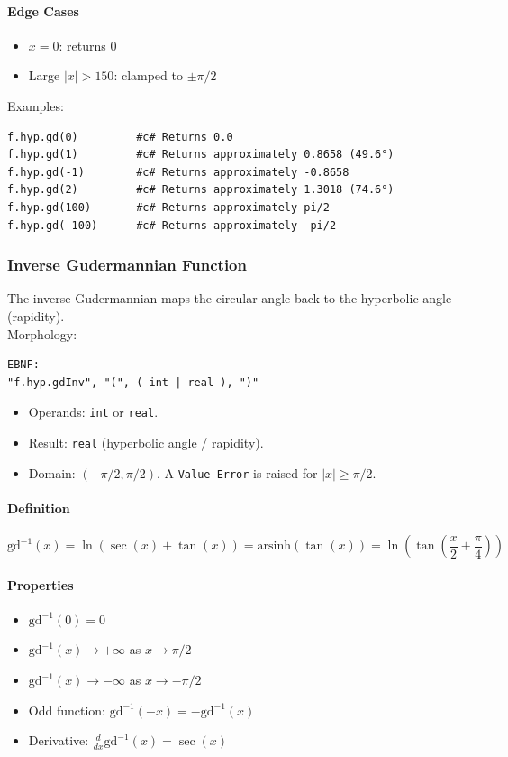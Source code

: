 \paragraph{Edge Cases}
\begin{itemize}
\item $x = 0$: returns $0$
\item Large $|x| > 150$: clamped to $\pm\pi/2$
\end{itemize}

Examples:
\begin{verbatim}
f.hyp.gd(0)         #c# Returns 0.0
f.hyp.gd(1)         #c# Returns approximately 0.8658 (49.6°)
f.hyp.gd(-1)        #c# Returns approximately -0.8658
f.hyp.gd(2)         #c# Returns approximately 1.3018 (74.6°)
f.hyp.gd(100)       #c# Returns approximately pi/2
f.hyp.gd(-100)      #c# Returns approximately -pi/2
\end{verbatim}

\subsubsection{Inverse Gudermannian Function}
The inverse Gudermannian maps the circular angle back to the hyperbolic angle (rapidity).\\
Morphology:
\begin{verbatim}
EBNF:
"f.hyp.gdInv", "(", ( int | real ), ")"
\end{verbatim}
\begin{itemize}
\item Operands: \texttt{int} or \texttt{real}.
\item Result: \texttt{real} (hyperbolic angle / rapidity).
\item Domain: $(-\pi/2, \pi/2)$. A \texttt{Value Error} is raised for $|x| \geq \pi/2$.
\end{itemize}

\paragraph{Definition}
\[
\text{gd}^{-1}(x) = \ln(\sec(x) + \tan(x)) = \text{arsinh}(\tan(x)) = \ln\left(\tan\left(\frac{x}{2} + \frac{\pi}{4}\right)\right)
\]

\paragraph{Properties}
\begin{itemize}
\item $\text{gd}^{-1}(0) = 0$
\item $\text{gd}^{-1}(x) \to +\infty$ as $x \to \pi/2$
\item $\text{gd}^{-1}(x) \to -\infty$ as $x \to -\pi/2$
\item Odd function: $\text{gd}^{-1}(-x) = -\text{gd}^{-1}(x)$
\item Derivative: $\frac{d}{dx}\text{gd}^{-1}(x) = \sec(x)$
\end{itemize}

